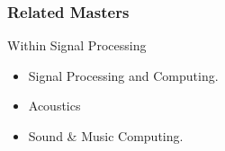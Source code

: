 \begin{frame}\frametitle{Related Masters}
    \begin{block}{Within Signal Processing} 
     \begin{itemize}
         \item Signal Processing and Computing.
         \item Acoustics
         \item Sound \& Music Computing.
     \end{itemize}
    \end{block}
\end{frame}

